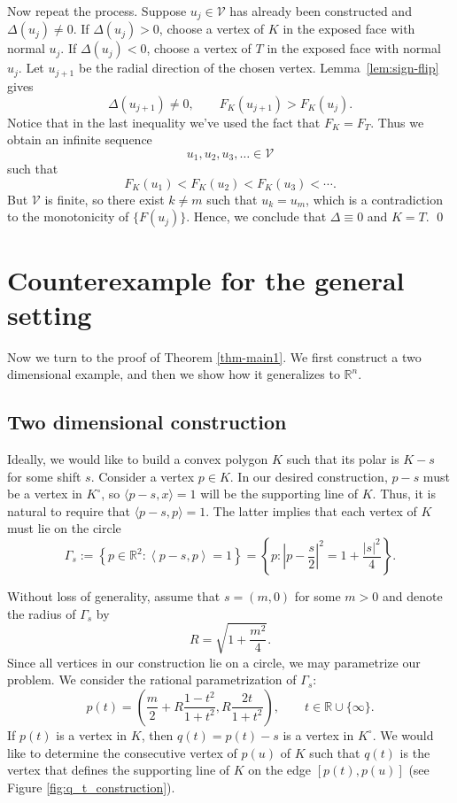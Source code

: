\documentclass[12pt]{article}
\theoremstyle{remark}
\newcommand{\R}{\mathbb R}
\newcommand{\ip}[2]{\left\langle #1,#2\right\rangle}
\begin{document}
Now repeat the process.  Suppose \(u_j\in\mathcal V\) has already been
constructed and \(\Delta(u_j)\ne0\).  If \(\Delta(u_j)>0\), choose a vertex of
\(K\) in the exposed face with normal \(u_j\).  If \(\Delta(u_j)<0\), choose a
vertex of \(T\) in the exposed face with normal \(u_j\).  Let \(u_{j+1}\) be
the radial direction of the chosen vertex.  Lemma~\ref{lem:sign-flip} gives
\[
        \Delta(u_{j+1}) \neq 0, \qquad F_K(u_{j+1})>F_K(u_j).
\]
Notice that in the last inequality we've used the fact that $F_K = F_T$.
Thus we obtain an infinite sequence
\[
        u_1,u_2,u_3,\dots\in\mathcal V
\]
such that
\[
        F_K(u_1)<F_K(u_2)<F_K(u_3)<\cdots.
\]
But \(\mathcal V\) is finite, so there exist $k \neq m$ such that $u_k = u_m$, which is a contradiction to the monotonicity of $\{F(u_j)\}$. 
Hence, we conclude that $\Delta \equiv 0$ and $K=T$.
\qed

\section{Counterexample for the general setting}
Now we turn to the proof of Theorem \ref{thm-main1}. We first construct a two dimensional example, and then we show how it generalizes to $\R^n$.

\subsection{Two dimensional construction}
Ideally, we would like to build a convex polygon $K$ such that its polar is $K-s$ for some shift $s$.  
Consider a vertex $p \in K$. In our desired construction, $p-s$ must be a vertex in $K^\circ$, so $\langle p-s, x\rangle = 1$ will be the supporting line of $K$.
Thus, it is natural to require that $\langle p-s, p\rangle = 1$.
The latter implies that each vertex of $K$ must lie on the circle 
\begin{equation}\label{eq:Gamma-s}
        \Gamma_s
        :=\left\{p\in\R^2:\ip{p-s}{p}=1\right\}
        =\left\{p:\left|p-\frac{s}{2}\right|^2=1+\frac{|s|^2}{4}\right\}.
\end{equation}

Without loss of generality, assume that $s = (m, 0)$ for some $m > 0$ and denote the radius of $\Gamma_s$ by 
\[
R = \sqrt{1+\frac{m^2}{4}}.
\]
Since all vertices in our construction lie on a circle, we may parametrize our problem. We consider the rational parametrization of $\Gamma_s$:
\[
p(t) = \left(\frac{m}{2} + R\frac{1-t^2}{1+t^2}, R\frac{2t}{1+t^2}\right), \qquad t \in \mathbb{R} \cup \{\infty\}.
\]
If $p(t)$ is a vertex in $K$, then $q(t)=p(t)-s$ is a vertex in $K^\circ$. We would like to determine the consecutive vertex of $p(u)$ of $K$ such that $q(t)$ is the vertex that defines the supporting line of $K$ on the edge $[p(t), p(u)]$ (see Figure \ref{fig:q_t_construction}).
\end{document}
